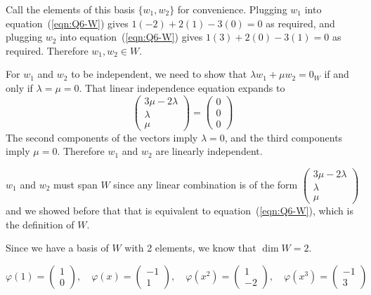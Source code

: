 \documentclass[a4paper]{article}
\begin{document}
Call the elements of this basis $\{ w_1, w_2 \}$ for convenience. Plugging $w_1$ into equation~(\ref{eqn:Q6-W}) gives $1(-2) + 2(1)  - 3(0) = 0$ as required, and plugging $w_2$ into equation~(\ref{eqn:Q6-W}) gives $1(3) + 2(0) - 3(1) = 0$ as required. Therefore $w_1, w_2 \in W$.

For $w_1$ and $w_2$ to be independent, we need to show that $\lambda w_1 + \mu w_2 = 0_W$ if and only if $\lambda = \mu = 0$. That linear independence equation expands to $$\begin{pmatrix}3 \mu - 2 \lambda\\ \lambda\\ \mu\end{pmatrix} = \begin{pmatrix}0\\ 0\\ 0\end{pmatrix}$$
The second components of the vectors imply $\lambda = 0$, and the third components imply $\mu = 0$. Therefore $w_1$ and $w_2$ are linearly independent.

$w_1$ and $w_2$ must span $W$ since any linear combination is of the form $\begin{pmatrix}3 \mu - 2 \lambda\\ \lambda\\ \mu\end{pmatrix}$ and we showed before that that is equivalent to equation~(\ref{eqn:Q6-W}), which is the definition of $W$.

Since we have a basis of $W$ with 2 elements, we know that $\dim W = 2$.



$$\varphi(1) = \begin{pmatrix}1\\ 0\end{pmatrix}, \quad \varphi(x) = \begin{pmatrix}-1\\ 1\end{pmatrix}, \quad \varphi(x^2) = \begin{pmatrix}1\\ -2\end{pmatrix}, \quad \varphi(x^3) = \begin{pmatrix}-1\\ 3\end{pmatrix}$$

\subsection{~}
\end{document}
